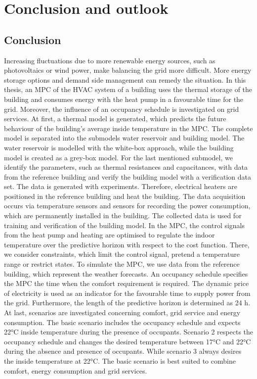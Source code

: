 \chapter{Conclusion and outlook}
\label{ch:Conclusionandoutlook}

\section{Conclusion}
\label{sec:conclusion}
Increasing fluctuations due to more renewable energy sources, such as photovoltaics or wind power, make balancing the grid more difficult. More energy storage options and demand side management can remedy the situation. In this thesis, an MPC of the HVAC system of a building uses the thermal storage of the building and consumes energy with the heat pump in a favourable time for the grid. Moreover, the influence of an occupancy schedule is investigated on grid services.\newline
At first, a thermal model is generated, which predicts the future behaviour of the building's average inside temperature in the MPC. The complete model is separated into the submodels water reservoir and building model. The water reservoir is modelled with the white-box approach, while the building model is created as a grey-box model. For the last mentioned submodel, we identify the parameters, such as thermal resistances and capacitances, with data from the reference building and verify the building model with a verification data set. The data is generated with experiments. Therefore, electrical heaters are positioned in the reference building and heat the building. The data acquisition occurs via temperature sensors and sensors for recording the power consumption, which are permanently installed in the building. The collected data is used for training and verification of the building model. \newline
In the MPC, the control signals from the heat pump and heating are optimised to regulate the indoor temperature over the predictive horizon with respect to the cost function. There, we consider constraints, which limit the control signal, pretend a temperature range or restrict states. To simulate the MPC, we use data from the reference building, which represent the weather forecasts. An occupancy schedule specifies the MPC the time when the comfort requirement is required. The dynamic price of electricity is used as an indicator for the favourable time to supply power from the grid. Furthermore, the length of the predictive horizon is determined as 24 h.\newline
At last, scenarios are investigated concerning comfort, grid service and energy consumption. The basic scenario includes the occupancy schedule and expects 22°C inside temperature during the presence of occupants. Scenario 2 respects the occupancy schedule and changes the desired temperature between 17°C and 22°C during the absence and presence of occupants. While scenario 3 always desires the inside temperature at 22°C. The basic scenario is best suited to combine comfort, energy consumption and grid services.\newline

